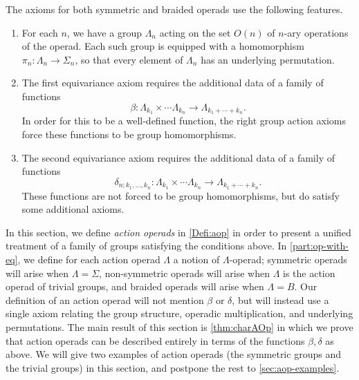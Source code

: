 The axioms for both symmetric and braided operads use the following features.
\begin{enumerate}
\item For each $n$, we have a group $\Lambda_n$ acting on the set $O(n)$ of $n$-ary operations of the operad. Each such group is equipped with a homomorphism $\pi_n \colon \Lambda_n \to \Sigma_n$, so that every element of $\Lambda_n$ has an underlying permutation.
\item The first equivariance axiom requires the additional data of a family of functions
\[
\beta \colon \Lambda_{k_1} \times \cdots \Lambda_{k_n} \to \Lambda_{k_1 + \cdots + k_n}.
\]
In order for this to be a well-defined function, the right group action axioms force these functions to be group homomorphisms.
\item The second equivariance axiom requires the additional data of a family of functions
\[
\delta_{n; k_1, \ldots, k_n} \colon \Lambda_{k_1} \times \cdots \Lambda_{k_n} \to \Lambda_{k_1 + \cdots + k_n}.
\]
These functions are not forced to be group homomorphisms, but do satisfy some additional axioms.
\end{enumerate}
In this section, we define \emph{action operads} in \cref{Defi:aop} in order to present a unified treatment of a family of groups satisfying the conditions above. 
In \cref{part:op-with-eq}, we define for each action operad $\Lambda$ a notion of $\Lambda$-operad; symmetric operads will arise when $\Lambda = \Sigma$, non-symmetric operads will arise when $\Lambda$ is the action operad of trivial groups, and braided operads will arise when $\Lambda = B$.
Our definition of an action operad will not mention $\beta$ or $\delta$, but will instead use a single axiom relating the group structure, operadic multiplication, and underlying permutations. 
The main result of this section is \cref{thm:charAOp} in which we prove that action operads can be described entirely in terms of the functions $\beta, \delta$ as above.
We will give two examples of action operads (the symmetric groups and the trivial groups) in this section, and postpone the rest to \cref{sec:aop-examples}.


